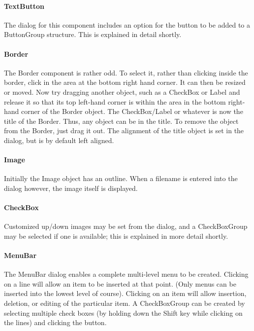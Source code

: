 \paragraph{TextButton}
The dialog for this component includes an option for the button to be
added to a \textsf{ButtonGroup} structure. This is explained in detail
shortly.

\paragraph{Border}
The \textsf{Border} component is rather odd. To select it, rather than
clicking inside the border, click in the area at the bottom right hand
corner. It can then be resized or moved. Now try dragging another
object, such as a \textsf{CheckBox} or \textsf{Label} and release it so
that its top left-hand corner is within the area in the bottom
right-hand corner of the \textsf{Border} object. The
\textsf{CheckBox}/\textsf{Label} or whatever is now the title of the
\textsf{Border}. Thus, any object can be in the title. To remove the
object from the \textsf{Border}, just drag it out. The alignment of the
title object is set in the dialog, but is by default left aligned.

\paragraph{Image}
Initially the Image object has an outline. When a filename is entered
into the dialog however, the image itself is displayed.

\paragraph{CheckBox}
Customized up/down images may be set from the dialog, and a
\textsf{CheckBoxGroup} may be selected if one is available; this is
explained in more detail shortly.

\paragraph{MenuBar}
The \textsf{MenuBar} dialog enables a complete multi-level menu to be
created. Clicking on a line will allow an item to be inserted at that
point. (Only menus can be inserted into the lowest level of course).
Clicking on an item will allow insertion, deletion, or editing of the
particular item. A \textsf{CheckBoxGroup} can be created by selecting
multiple check boxes (by holding down the Shift key while clicking on
the lines) and clicking the button.

